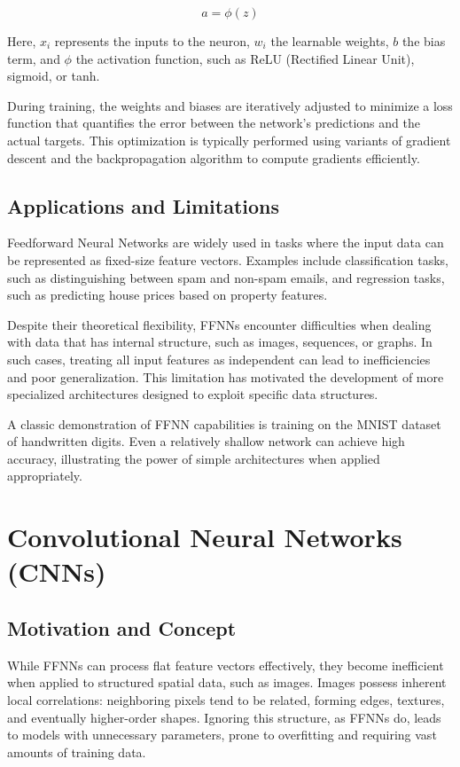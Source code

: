 \documentclass[openany]{book}
\begin{document}
\begin{equation}
a = \phi(z)
\end{equation}

Here, $x_i$ represents the inputs to the neuron, $w_i$ the learnable weights, 
$b$ the bias term, and $\phi$ the activation function, such as ReLU (Rectified 
Linear Unit), sigmoid, or tanh.

During training, the weights and biases are iteratively adjusted to minimize a 
loss function that quantifies the error between the network's predictions and 
the actual targets. This optimization is typically performed using variants of 
gradient descent and the backpropagation algorithm to compute gradients 
efficiently.

\subsection{Applications and Limitations}

Feedforward Neural Networks are widely used in tasks where the input data can be 
represented as fixed-size feature vectors. Examples include classification 
tasks, such as distinguishing between spam and non-spam emails, and regression 
tasks, such as predicting house prices based on property features.

Despite their theoretical flexibility, FFNNs encounter difficulties when dealing 
with data that has internal structure, such as images, sequences, or graphs. In 
such cases, treating all input features as independent can lead to 
inefficiencies and poor generalization. This limitation has motivated the 
development of more specialized architectures designed to exploit specific data 
structures.

A classic demonstration of FFNN capabilities is training on the MNIST dataset of 
handwritten digits. Even a relatively shallow network can achieve high accuracy, 
illustrating the power of simple architectures when applied appropriately.

\section{Convolutional Neural Networks (CNNs)}

\subsection{Motivation and Concept}

While FFNNs can process flat feature vectors effectively, they become 
inefficient when applied to structured spatial data, such as images. Images 
possess inherent local correlations: neighboring pixels tend to be related, 
forming edges, textures, and eventually higher-order shapes. Ignoring this 
structure, as FFNNs do, leads to models with unnecessary parameters, prone to 
overfitting and requiring vast amounts of training data.
\end{document}
